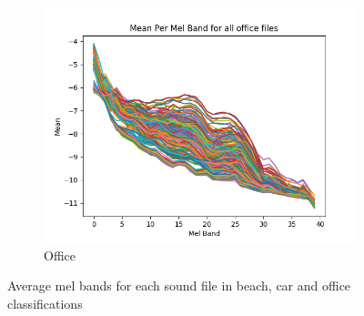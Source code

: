\documentclass[11pt]{article}
\begin{document}
\begin{figure}[h]
\begin{subfigure}[t]{0.31\textwidth}
		\includegraphics[width=\textwidth]{figures/office.png}
		\caption{Office}
	\end{subfigure}
	\caption{Average mel bands for each sound file in beach, car and office classifications}
	\label{fig:beachCarOfficeAvg}
\end{figure}
\end{document}
